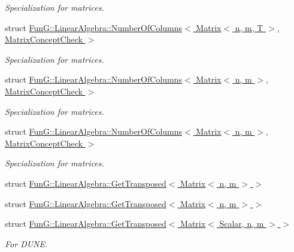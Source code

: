 \begin{DoxyCompactItemize}
\begin{DoxyCompactList}\small\item\em \-Specialization for matrices. \end{DoxyCompactList}\item 
struct \hyperlink{structFunG_1_1LinearAlgebra_1_1NumberOfColumns_3_01Matrix_3_01n_00_01m_00_01T_01_4_00_01MatrixConceptCheck_01_4}{\-Fun\-G\-::\-Linear\-Algebra\-::\-Number\-Of\-Columns$<$ Matrix$<$ n, m, T $>$, Matrix\-Concept\-Check $>$}
\begin{DoxyCompactList}\small\item\em \-Specialization for matrices. \end{DoxyCompactList}\item 
struct \hyperlink{structFunG_1_1LinearAlgebra_1_1NumberOfColumns_3_01Matrix_3_01n_00_01m_01_4_00_01MatrixConceptCheck_01_4}{\-Fun\-G\-::\-Linear\-Algebra\-::\-Number\-Of\-Columns$<$ Matrix$<$ n, m $>$, Matrix\-Concept\-Check $>$}
\begin{DoxyCompactList}\small\item\em \-Specialization for matrices. \end{DoxyCompactList}\item 
struct \hyperlink{structFunG_1_1LinearAlgebra_1_1NumberOfColumns_3_01Matrix_3_01n_00_01m_01_4_00_01MatrixConceptCheck_01_4}{\-Fun\-G\-::\-Linear\-Algebra\-::\-Number\-Of\-Columns$<$ Matrix$<$ n, m $>$, Matrix\-Concept\-Check $>$}
\begin{DoxyCompactList}\small\item\em \-Specialization for matrices. \end{DoxyCompactList}\item 
struct \hyperlink{structFunG_1_1LinearAlgebra_1_1GetTransposed_3_01Matrix_3_01n_00_01m_01_4_01_4}{\-Fun\-G\-::\-Linear\-Algebra\-::\-Get\-Transposed$<$ Matrix$<$ n, m $>$ $>$}
\item 
struct \hyperlink{structFunG_1_1LinearAlgebra_1_1GetTransposed_3_01Matrix_3_01n_00_01m_01_4_01_4}{\-Fun\-G\-::\-Linear\-Algebra\-::\-Get\-Transposed$<$ Matrix$<$ n, m $>$ $>$}
\item 
struct \hyperlink{structFunG_1_1LinearAlgebra_1_1GetTransposed_3_01Matrix_3_01Scalar_00_01n_00_01m_01_4_01_4}{\-Fun\-G\-::\-Linear\-Algebra\-::\-Get\-Transposed$<$ Matrix$<$ Scalar, n, m $>$ $>$}
\begin{DoxyCompactList}\small\item\em \-For \-D\-U\-N\-E. \end{DoxyCompactList}\item 

\end{DoxyCompactItemize}
